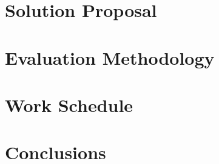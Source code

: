 \documentclass[runningheads]{llncs}
\begin{document}

\section{Solution Proposal}\label{sec:proposal}

\section{Evaluation Methodology}\label{sec:methodology}

\section{Work Schedule}\label{sec:workschedule}

\section{Conclusions}\label{sec:conclusion}



\end{document}
